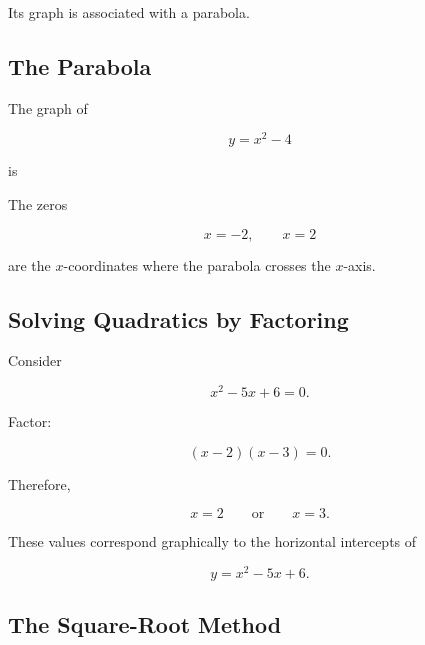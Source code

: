 Its graph is associated with a parabola.

\subsection{The Parabola}
\label{subsec:parabola-visual}

The graph of

\[ y=x^2-4 \]

is

\begin{center}
\end{center}

The zeros

\[ x=-2,\qquad x=2 \]

are the \(x\)-coordinates where the parabola crosses the \(x\)-axis.

\subsection{Solving Quadratics by Factoring}
\label{subsec:quadratic-factoring}

Consider

\[ x^2-5x+6=0. \]

Factor:

\[ (x-2)(x-3)=0. \]

Therefore,

\[ x=2\qquad\text{or}\qquad x=3. \]

These values correspond graphically to the horizontal intercepts of

\[ y=x^2-5x+6. \]

\subsection{The Square-Root Method}
\label{subsec:square-root-method}

